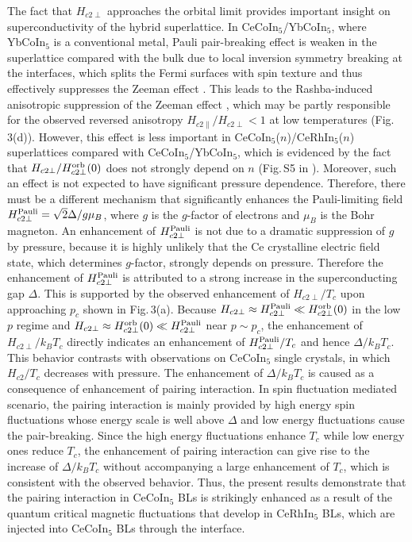 \documentclass[twocolumn,preprintnumbers,amsmath,amssymb,prl]{revtex4}
\begin{document}
The fact that  $H_{c2\perp}$ approaches the orbital limit provides important insight on superconductivity of the hybrid superlattice. In CeCoIn$_5$/YbCoIn$_5$, where YbCoIn$_5$ is a conventional metal, Pauli pair-breaking effect is weaken in the superlattice compared with the bulk due to local inversion symmetry breaking at the interfaces, which splits the Fermi surfaces with spin texture and thus effectively suppresses the Zeeman effect \cite{Goh,Maruyama2012}. This leads to the Rashba-induced anisotropic suppression of the Zeeman effect \cite{Shimozawa2016}, which may be partly responsible for the observed reversed anisotropy $H_{c2\parallel}/H_{c2\perp}<1$ at low temperatures (Fig.\,3(d)). However, this effect is less important in CeCoIn$_5$($n$)/CeRhIn$_5$($n$) superlattices compared with  CeCoIn$_5$/YbCoIn$_5$, which is evidenced by the fact that  $H_{c2\perp}/H_{c2\perp}^{\rm orb}(0)$ does not strongly depend on $n$ (Fig.\,S5 in \cite{SM}). Moreover, such an effect is not expected to have significant pressure dependence. Therefore, there must be a different mechanism that significantly enhances the Pauli-limiting field $H_{c2\perp}^{\rm Pauli}=\sqrt{2}\Delta/g\mu_B$,  where $g$ is the $g$-factor of electrons and $\mu_B$ is the Bohr magneton.  An enhancement of $H_{c2\perp}^{\rm Pauli}$ is not due to a dramatic suppression of $g$ by pressure, because it is highly unlikely that the Ce crystalline electric field state, which determines $g$-factor, strongly depends on pressure.  Therefore the enhancement of  $H_{c2\perp}^{\rm Pauli}$ is attributed to a strong increase in the superconducting gap $\Delta$.  This is supported by the observed enhancement of  $H_{c2\perp}/T_c$ upon approaching $p_c$ shown in Fig.\,3(a).    Because  $H_{c2\perp}\approx H_{c2\perp}^{\rm Pauli} \ll H_{c2\perp}^{\rm orb}(0)$ in the low $p$ regime and  $H_{c2\perp}\approx H_{c2\perp}^{\rm orb}(0) \ll H_{c2\perp}^{\rm Pauli}$ near $p\sim p_c$,   the enhancement of  $H_{c2\perp}/k_BT_c$ directly indicates an enhancement of $H_{c2\perp}^{\rm Pauli}/T_c$ and hence $\Delta/k_BT_c$.  This behavior  contrasts with observations on  CeCoIn$_5$ single crystals, in which $H_{c2}/T_c$ decreases with pressure.  The enhancement of $\Delta/k_BT_c$ is caused as a consequence of enhancement of pairing interaction. In spin fluctuation mediated scenario, the pairing interaction is mainly provided by high energy spin fluctuations whose energy scale is well above $\Delta$ and  low energy fluctuations cause the pair-breaking.  Since the high energy fluctuations enhance $T_c$ while low energy ones reduce $T_c$,  the enhancement of pairing interaction can give rise to the increase of $\Delta/k_BT_c$ without accompanying a large enhancement of $T_c$, which is consistent with the observed behavior.  Thus, the present results demonstrate that  the pairing interaction in CeCoIn$_5$ BLs is strikingly enhanced as a result of the quantum critical magnetic fluctuations  that develop in  CeRhIn$_5$ BLs, which are injected into CeCoIn$_5$ BLs  through the interface. 
\end{document}
